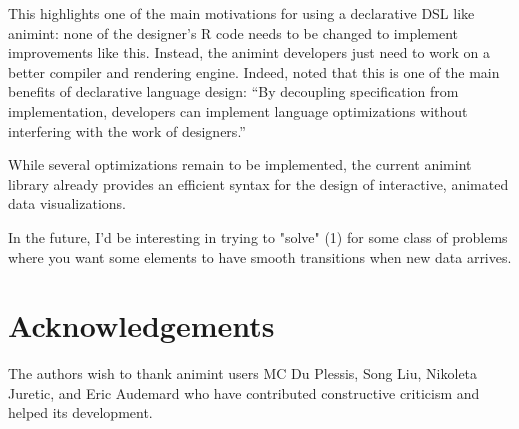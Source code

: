 \documentclass[journal]{vgtc}\usepackage[]{graphicx}\usepackage[]{color}
\begin{document}
This highlights one of the main motivations for using a declarative
DSL like animint: none of the designer's R code needs to be changed to
implement improvements like this. Instead, the animint developers just
need to work on a better compiler and rendering engine. Indeed,
\citet{declarative} noted that this is one of the main benefits of
declarative language design: ``By decoupling specification from
implementation, developers can implement language optimizations
without interfering with the work of designers.''

While several
optimizations remain to be implemented, the current animint library
already provides an efficient syntax for the design of interactive,
animated data visualizations.

In the future, I'd be interesting in trying to "solve" (1) for some
class of problems where you want some elements to have smooth
transitions when new data arrives.

\section*{Acknowledgements}

The authors wish to thank animint users MC Du Plessis, Song Liu,
Nikoleta Juretic, and Eric Audemard
who have contributed constructive criticism and helped its development.

%



\end{document}
